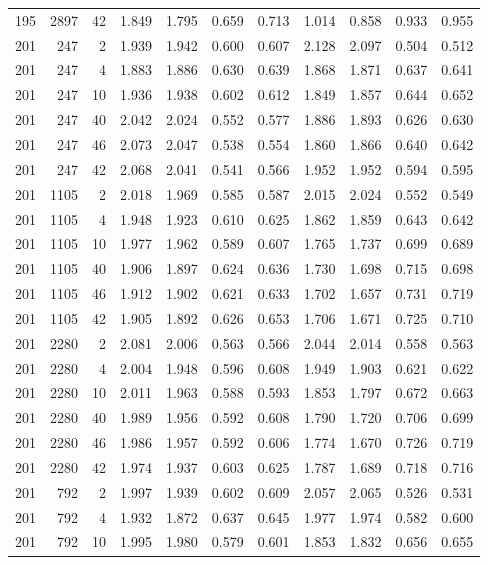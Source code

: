 \documentclass[journal=jacsat,manuscript=article]{achemso}
\begin{document}
\begin{table}
\begin{tabular}{rrr|rrrr|rrrr}
195 & 2897 & 42 & 1.849 & 1.795 & 0.659 & 0.713 & 1.014 & 0.858 & 0.933 & 0.955\\
201 & 247 & 2 & 1.939 & 1.942 & 0.600 & 0.607 & 2.128 & 2.097 & 0.504 & 0.512\\
201 & 247 & 4 & 1.883 & 1.886 & 0.630 & 0.639 & 1.868 & 1.871 & 0.637 & 0.641\\
201 & 247 & 10 & 1.936 & 1.938 & 0.602 & 0.612 & 1.849 & 1.857 & 0.644 & 0.652\\
201 & 247 & 40 & 2.042 & 2.024 & 0.552 & 0.577 & 1.886 & 1.893 & 0.626 & 0.630\\
201 & 247 & 46 & 2.073 & 2.047 & 0.538 & 0.554 & 1.860 & 1.866 & 0.640 & 0.642\\
201 & 247 & 42 & 2.068 & 2.041 & 0.541 & 0.566 & 1.952 & 1.952 & 0.594 & 0.595\\
201 & 1105 & 2 & 2.018 & 1.969 & 0.585 & 0.587 & 2.015 & 2.024 & 0.552 & 0.549\\
201 & 1105 & 4 & 1.948 & 1.923 & 0.610 & 0.625 & 1.862 & 1.859 & 0.643 & 0.642\\
201 & 1105 & 10 & 1.977 & 1.962 & 0.589 & 0.607 & 1.765 & 1.737 & 0.699 & 0.689\\
201 & 1105 & 40 & 1.906 & 1.897 & 0.624 & 0.636 & 1.730 & 1.698 & 0.715 & 0.698\\
201 & 1105 & 46 & 1.912 & 1.902 & 0.621 & 0.633 & 1.702 & 1.657 & 0.731 & 0.719\\
201 & 1105 & 42 & 1.905 & 1.892 & 0.626 & 0.653 & 1.706 & 1.671 & 0.725 & 0.710\\
201 & 2280 & 2 & 2.081 & 2.006 & 0.563 & 0.566 & 2.044 & 2.014 & 0.558 & 0.563\\
201 & 2280 & 4 & 2.004 & 1.948 & 0.596 & 0.608 & 1.949 & 1.903 & 0.621 & 0.622\\
201 & 2280 & 10 & 2.011 & 1.963 & 0.588 & 0.593 & 1.853 & 1.797 & 0.672 & 0.663\\
201 & 2280 & 40 & 1.989 & 1.956 & 0.592 & 0.608 & 1.790 & 1.720 & 0.706 & 0.699\\
201 & 2280 & 46 & 1.986 & 1.957 & 0.592 & 0.606 & 1.774 & 1.670 & 0.726 & 0.719\\
201 & 2280 & 42 & 1.974 & 1.937 & 0.603 & 0.625 & 1.787 & 1.689 & 0.718 & 0.716\\
201 & 792 & 2 & 1.997 & 1.939 & 0.602 & 0.609 & 2.057 & 2.065 & 0.526 & 0.531\\
201 & 792 & 4 & 1.932 & 1.872 & 0.637 & 0.645 & 1.977 & 1.974 & 0.582 & 0.600\\
201 & 792 & 10 & 1.995 & 1.980 & 0.579 & 0.601 & 1.853 & 1.832 & 0.656 & 0.655\\

\end{tabular}
\end{table}
\end{document}
